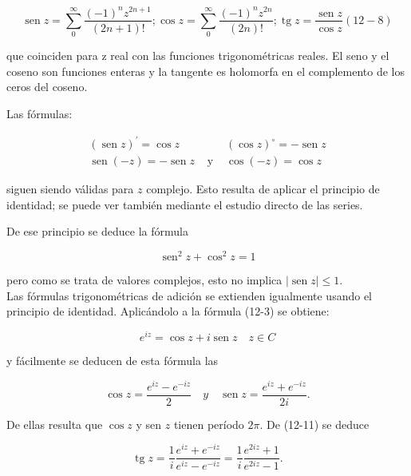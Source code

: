\documentclass[10pt]{article}
\theoremstyle{plain}
\theoremstyle{definition}
\theoremstyle{remark}
\begin{document}
$$
\operatorname{sen} z=\sum_{0}^{\infty} \frac{(-1)^{n} z^{2 n+1}}{(2 n+1)!} ; \cos z=\sum_{0}^{\infty} \frac{(-1)^{n} z^{2 n}}{(2 n)!} ; \operatorname{tg} z=\frac{\operatorname{sen} z}{\cos z}(12-8)
$$

que coinciden para z real con las funciones trigonométricas reales. El seno y el coseno son funciones enteras y la tangente es holomorfa en el complemento de los ceros del coseno.

Las fórmulas:

$$
\begin{array}{lll}
(\operatorname{sen} z)^{\prime}=\cos z & & (\cos z)^{\circ}=-\operatorname{sen} z \\
\operatorname{sen}(-z)=-\operatorname{sen} z & \text { y } & \cos (-z)=\cos z
\end{array}
$$

siguen siendo válidas para $z$ complejo. Esto resulta de aplicar el principio de identidad; se puede ver también mediante el estudio directo de las series.

De ese principio se deduce la fórmula


\begin{equation*}
\operatorname{sen}^{2} z+\cos ^{2} z=1 \tag{12-9}
\end{equation*}


pero como se trata de valores complejos, esto no implica $|\operatorname{sen} z| \leqslant 1$.\\
Las fórmulas trigonométricas de adición se extienden igualmente usando el principio de identidad. Aplicándolo a la fórmula (12-3) se obtiene:


\begin{equation*}
e^{i z}=\cos z+i \operatorname{sen} z \quad z \in C \tag{12-10}
\end{equation*}


y fácilmente se deducen de esta fórmula las


\begin{equation*}
\cos z=\frac{e^{i z}-e^{-i z}}{2} \quad y \quad \operatorname{sen} z=\frac{e^{i z}+e^{-i z}}{2 i} . \tag{12-11}
\end{equation*}


De ellas resulta que $\cos z$ y sen $z$ tienen período $2 \pi$. De (12-11) se deduce


\begin{equation*}
\operatorname{tg} z=\frac{1}{i} \frac{e^{i z}+e^{-i z}}{e^{i z}-e^{-i z}}=\frac{1}{i} \frac{e^{2 i z}+1}{e^{2 i z}-1} . \tag{12-12}
\end{equation*}
\end{document}
